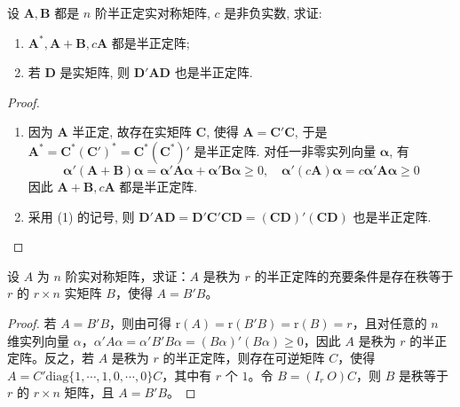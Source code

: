 \documentclass[../../main.tex]{subfiles}
\begin{document}
\begin{proposition}\label{proposition:半正定阵的相关性质}
设 \(\boldsymbol{A},\boldsymbol{B}\) 都是 \(n\) 阶半正定实对称矩阵, \(c\) 是非负实数, 求证:
\begin{enumerate}[(1)]
\item \(\boldsymbol{A}^*,\boldsymbol{A}+\boldsymbol{B},c\boldsymbol{A}\) 都是半正定阵;
\item 若 \(\boldsymbol{D}\) 是实矩阵, 则 \(\boldsymbol{D}'\boldsymbol{A}\boldsymbol{D}\) 也是半正定阵.
\end{enumerate}
\end{proposition}
\begin{proof}
\begin{enumerate}[(1)]
\item 因为 \(\boldsymbol{A}\) 半正定, 故存在实矩阵 \(\boldsymbol{C}\), 使得 \(\boldsymbol{A}=\boldsymbol{C}'\boldsymbol{C}\), 于是 \(\boldsymbol{A}^*=\boldsymbol{C}^*(\boldsymbol{C}')^*=\boldsymbol{C}^*(\boldsymbol{C}^*)'\) 是半正定阵. 对任一非零实列向量 \(\boldsymbol{\alpha}\), 有
\[\boldsymbol{\alpha}'(\boldsymbol{A}+\boldsymbol{B})\boldsymbol{\alpha}=\boldsymbol{\alpha}'\boldsymbol{A}\boldsymbol{\alpha}+\boldsymbol{\alpha}'\boldsymbol{B}\boldsymbol{\alpha}\geq0,\quad\boldsymbol{\alpha}'(c\boldsymbol{A})\boldsymbol{\alpha}=c\boldsymbol{\alpha}'\boldsymbol{A}\boldsymbol{\alpha}\geq0\]
因此 \(\boldsymbol{A}+\boldsymbol{B},c\boldsymbol{A}\) 都是半正定阵.
\item 采用 (1) 的记号, 则 \(\boldsymbol{D}'\boldsymbol{A}\boldsymbol{D}=\boldsymbol{D}'\boldsymbol{C}'\boldsymbol{C}\boldsymbol{D}=(\boldsymbol{C}\boldsymbol{D})'(\boldsymbol{C}\boldsymbol{D})\) 也是半正定阵.
\end{enumerate} 
\end{proof}

\begin{proposition}\label{proposition:半正定阵的行满秩分解}
设 $A$ 为 $n$ 阶实对称矩阵，求证：$A$ 是秩为 $r$ 的半正定阵的充要条件是存在秩等于 $r$ 的 $r\times n$ 实矩阵 $B$，使得 $A = B'B$。 
\end{proposition}
\begin{proof}
若 $A = B'B$，则由可得 $\mathrm{r}(A)=\mathrm{r}(B'B)=\mathrm{r}(B)=r$，且对任意的 $n$ 维实列向量 $\alpha$，$\alpha'A\alpha=\alpha'B'B\alpha=(B\alpha)'(B\alpha)\geq0$，因此 $A$ 是秩为 $r$ 的半正定阵。反之，若 $A$ 是秩为 $r$ 的半正定阵，则存在可逆矩阵 $C$，使得 $A = C'\mathrm{diag}\{1,\cdots,1,0,\cdots,0\}C$，其中有 $r$ 个 $1$。令 $B=(I_r\ O)C$，则 $B$ 是秩等于 $r$ 的 $r\times n$ 矩阵，且 $A = B'B$。 
\end{proof}
\end{document}
